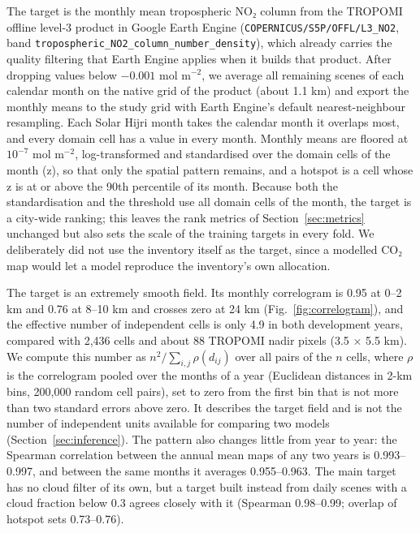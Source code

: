 \documentclass[pdflatex,sn-basic]{sn-jnl}
\begin{document}
The target is the monthly mean tropospheric NO₂ column from the TROPOMI offline level-3 product in Google Earth Engine (\nolinkurl{COPERNICUS/S5P/OFFL/L3_NO2}, band \nolinkurl{tropospheric_NO2_column_number_density}), which already carries the quality filtering that Earth Engine applies when it builds that product. After dropping values below $-0.001$ mol m$^{-2}$, we average all remaining scenes of each calendar month on the native grid of the product (about 1.1 km) and export the monthly means to the study grid with Earth Engine's default nearest-neighbour resampling. Each Solar Hijri month takes the calendar month it overlaps most, and every domain cell has a value in every month. Monthly means are floored at $10^{-7}$ mol m$^{-2}$, log-transformed and standardised over the domain cells of the month (z), so that only the spatial pattern remains, and a hotspot is a cell whose z is at or above the 90th percentile of its month. Because both the standardisation and the threshold use all domain cells of the month, the target is a city-wide ranking; this leaves the rank metrics of Section~\ref{sec:metrics} unchanged but also sets the scale of the training targets in every fold. We deliberately did not use the inventory itself as the target, since a modelled CO₂ map would let a model reproduce the inventory's own allocation.

The target is an extremely smooth field. Its monthly correlogram is 0.95 at 0--2 km and 0.76 at 8--10 km and crosses zero at 24 km (Fig.~\ref{fig:correlogram}), and the effective number of independent cells \citep{griffith2005} is only 4.9 in both development years, compared with 2,436 cells and about 88 TROPOMI nadir pixels (3.5 × 5.5 km). We compute this number as $n^2 / \sum_{i,j} \rho(d_{ij})$ over all pairs of the $n$ cells, where $\rho$ is the correlogram pooled over the months of a year (Euclidean distances in 2-km bins, 200,000 random cell pairs), set to zero from the first bin that is not more than two standard errors above zero. It describes the target field and is not the number of independent units available for comparing two models (Section~\ref{sec:inference}). The pattern also changes little from year to year: the Spearman correlation between the annual mean maps of any two years is 0.993--0.997, and between the same months it averages 0.955--0.963. The main target has no cloud filter of its own, but a target built instead from daily scenes with a cloud fraction below 0.3 agrees closely with it (Spearman 0.98--0.99; overlap of hotspot sets 0.73--0.76).
\end{document}
